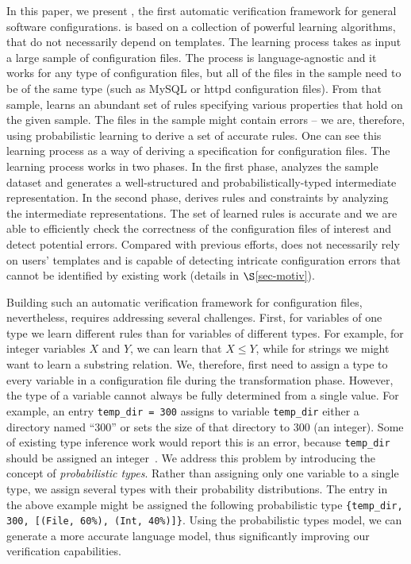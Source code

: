 In this paper, we present \app, the first automatic verification framework
for general software configurations. \app is based on a collection of powerful learning 
algorithms, that do not necessarily depend on templates. The learning process takes as input a
 large sample of configuration files. The process is language-agnostic and it works for any type of configuration files, 
but all of the files in the sample need to be of the same type (such as
MySQL or httpd configuration files). From that sample,
\app learns an abundant set of rules specifying various properties that hold on the given sample. The files in the sample might contain
errors -- we are, therefore, using probabilistic learning to derive a set of accurate rules. One can see this learning process as a
way of deriving  
a specification for configuration files. 
The learning process works in two phases. In the first phase, 
\app analyzes the sample dataset and generates a 
well-structured and probabilistically-typed 
intermediate representation. 
In the second phase, \app derives rules and constraints by analyzing
the intermediate representations.  The set of learned rules is accurate and we are able to efficiently check 
the correctness of the configuration files
of interest and detect potential errors.
Compared with previous efforts,
\app does not necessarily rely on users' templates 
and is capable of detecting intricate configuration errors that
cannot be identified by existing work (details in $\S$\ref{sec-motiv}). 

Building such an automatic verification framework for
configuration files, nevertheless, requires addressing several challenges. 
First, for variables of one type 
we learn different rules than for variables of different types. 
For example, for integer variables $X$ and $Y$, 
we can learn that $X \leq Y$, while 
for strings we might want to learn a substring relation. We, therefore, first need to assign a type to every variable in a configuration file during the transformation phase.
However,
the type of a variable cannot always be fully determined 
from a single value. 
For example, an entry {\tt temp\_dir = 300} assigns to variable {\tt temp\_dir} either a directory named ``300'' or sets the size of that directory to 300 (an integer).
Some of existing type inference 
work would report this is an error, because {\tt temp\_dir} should be assigned
an integer~\cite{zhang14encore}. We address this problem by introducing the concept of
{\emph{probabilistic types}}.
Rather than assigning only one variable to a single type, 
we assign several types with their probability distributions. 
The entry in the above example might be assigned 
the following probabilistic type
{\tt \{temp\_dir, 300, [(File, 60\%), (Int, 40\%)]\}}.
Using the probabilistic types model,
we can generate a more accurate language model,
thus significantly improving our verification capabilities.

